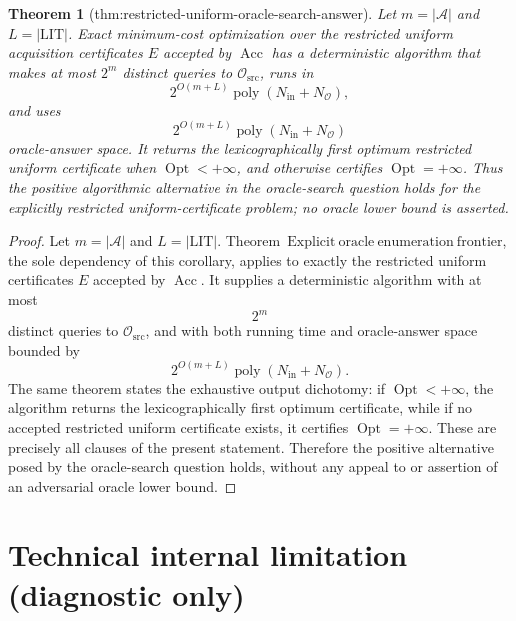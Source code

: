 \documentclass{article}
\newtheorem{theorem}{Theorem}
\begin{document}
\begin{theorem}[thm:restricted-uniform-oracle-search-answer]\label{thm:restricted-uniform-oracle-search-answer}
Let \(m=|\mathcal A|\) and \(L=|\mathrm{LIT}|\).  Exact minimum-cost optimization over the restricted uniform acquisition certificates \(E\) accepted by \(\operatorname{Acc}\) has a deterministic algorithm that makes at most \(2^m\) distinct queries to \(\mathcal O_{\mathrm{src}}\), runs in
\[
 2^{O(m+L)}\operatorname{poly}(N_{\mathrm{in}}+N_{\mathcal O}),
\]
and uses
\[
 2^{O(m+L)}\operatorname{poly}(N_{\mathrm{in}}+N_{\mathcal O})
\]
oracle-answer space.  It returns the lexicographically first optimum restricted uniform certificate when \(\operatorname{Opt}<+\infty\), and otherwise certifies \(\operatorname{Opt}=+\infty\).  Thus the positive algorithmic alternative in the oracle-search question holds for the explicitly restricted uniform-certificate problem; no oracle lower bound is asserted.
\end{theorem}
\begin{proof}
Let \(m=|\mathcal A|\) and \(L=|\mathrm{LIT}|\).  Theorem~\(\mathrm{Explicit\ oracle\ enumeration\ frontier}\), the sole dependency of this corollary, applies to exactly the restricted uniform certificates \(E\) accepted by \(\operatorname{Acc}\).  It supplies a deterministic algorithm with at most
\[
 2^m
\]
distinct queries to \(\mathcal O_{\mathrm{src}}\), and with both running time and oracle-answer space bounded by
\[
 2^{O(m+L)}\operatorname{poly}(N_{\mathrm{in}}+N_{\mathcal O}).
\]
The same theorem states the exhaustive output dichotomy: if \(\operatorname{Opt}<+\infty\), the algorithm returns the lexicographically first optimum certificate, while if no accepted restricted uniform certificate exists, it certifies \(\operatorname{Opt}=+\infty\).  These are precisely all clauses of the present statement.  Therefore the positive alternative posed by the oracle-search question holds, without any appeal to or assertion of an adversarial oracle lower bound.
\end{proof}

\section*{Technical internal limitation (diagnostic only)}
\end{document}
